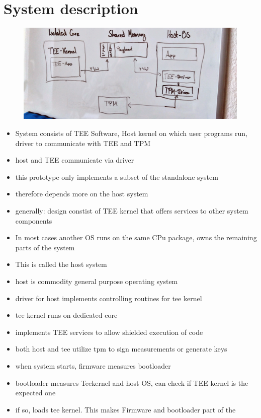 \section{System description}
\begin{figure}
      \includegraphics[width=.8\textwidth]{images/architecture.JPG}
\end{figure}
\begin{itemize}
      \item System consists of TEE Software, Host kernel on which user programs run,
            driver to communicate with TEE and TPM
      \item host and TEE communicate via driver
      \item this prototype only implements a subset of the standalone system
      \item therefore depends more on the host system
      \item generally: design constist of TEE kernel that offers services to other
            system components
      \item In most cases another OS runs on the same CPu package, owns the remaining parts of the system
      \item This is called the host system
      \item host is commodity general purpose operating system
      \item driver for host implements controlling routines for tee kernel
      \item tee kernel runs on dedicated core
      \item implements TEE services to allow shielded execution of code
      \item both host and tee utilize tpm to sign measurements or generate keys
      \item when system starts, firmware measures bootloader
      \item bootloader measures Teekernel and host OS, can check if TEE kernel is
            the expected one
      \item if so, loads tee kernel. This makes Firmware and bootloader part of the

\end{itemize}
